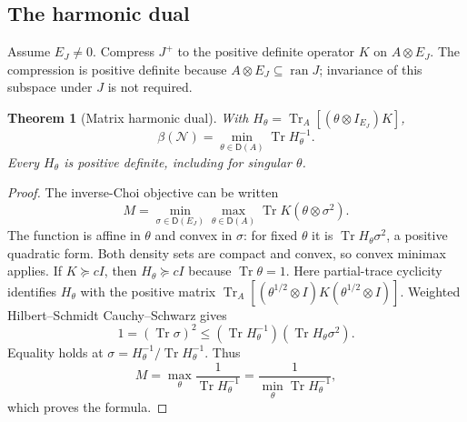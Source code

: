 \documentclass[11pt]{article}
\numberwithin{equation}{section}
\newtheorem{theorem}{Theorem}[section]
\theoremstyle{definition}
\theoremstyle{remark}
\DeclareMathOperator{\Tr}{Tr}
\DeclareMathOperator{\ran}{ran}
\newcommand{\N}{\mathcal N}
\newcommand{\States}{\mathsf D}
\begin{document}
\subsection{The harmonic dual}

Assume $E_J\ne0$. Compress $J^+$ to the positive definite operator
$K$ on $A\otimes E_J$. The compression is positive definite because
$A\otimes E_J\subseteq\ran J$; invariance of this subspace under $J$
is not required.

\begin{theorem}[Matrix harmonic dual]
\label{thm:harmonic}
With $H_\theta=\Tr_A[(\theta\otimes I_{E_J})K]$,
\begin{equation}
 \boxed{\quad
 \beta(\N)=\min_{\theta\in\States(A)}\Tr H_\theta^{-1}.
 \quad}
 \label{eq:harmonic-dual}
\end{equation}
Every $H_\theta$ is positive definite, including for singular $\theta$.
\end{theorem}
\begin{proof}
The inverse-Choi objective can be written
\[
 M=\min_{\sigma\in\States(E_J)}\max_{\theta\in\States(A)}
       \Tr K(\theta\otimes\sigma^2).
\]
The function is affine in $\theta$ and convex in $\sigma$:
for fixed $\theta$ it is $\Tr H_\theta\sigma^2$, a positive quadratic
form. Both density sets are compact and convex, so convex minimax applies.
If $K\succeq cI$, then $H_\theta\succeq cI$ because $\Tr\theta=1$.
Here partial-trace cyclicity identifies $H_\theta$ with the positive
matrix
$\Tr_A[(\theta^{1/2}\otimes I)K(\theta^{1/2}\otimes I)]$.
Weighted Hilbert--Schmidt Cauchy--Schwarz gives
\[
 1=(\Tr\sigma)^2
 \leq(\Tr H_\theta^{-1})(\Tr H_\theta\sigma^2).
\]
Equality holds at
$\sigma=H_\theta^{-1}/\Tr H_\theta^{-1}$.
Thus
\[
 M=\max_\theta\frac1{\Tr H_\theta^{-1}}
   =\frac1{\min_\theta\Tr H_\theta^{-1}},
\]
which proves the formula.
\end{proof}
\end{document}
